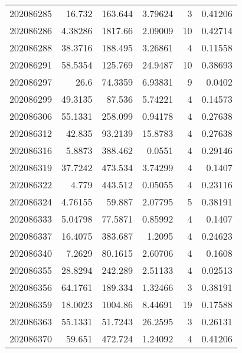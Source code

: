 \begin{tabular}{rrrrrr}
 202086285 &         16.732   &      163.644  &            3.79624 &           3 & 0.41206 \\
 202086286 &          4.38286 &     1817.66   &            2.09009 &          10 & 0.42714 \\
 202086288 &         38.3716  &      188.495  &            3.26861 &           4 & 0.11558 \\
 202086291 &         58.5354  &      125.769  &           24.9487  &          10 & 0.38693 \\
 202086297 &         26.6     &       74.3359 &            6.93831 &           9 & 0.0402  \\
 202086299 &         49.3135  &       87.536  &            5.74221 &           4 & 0.14573 \\
 202086306 &         55.1331  &      258.099  &            0.94178 &           4 & 0.27638 \\
 202086312 &         42.835   &       93.2139 &           15.8783  &           4 & 0.27638 \\
 202086316 &          5.8873  &      388.462  &            0.0551  &           4 & 0.29146 \\
 202086319 &         37.7242  &      473.534  &            3.74299 &           4 & 0.1407  \\
 202086322 &          4.779   &      443.512  &            0.05055 &           4 & 0.23116 \\
 202086324 &          4.76155 &       59.887  &            2.07795 &           5 & 0.38191 \\
 202086333 &          5.04798 &       77.5871 &            0.85992 &           4 & 0.1407  \\
 202086337 &         16.4075  &      383.687  &            1.2095  &           4 & 0.24623 \\
 202086340 &          7.2629  &       80.1615 &            2.60706 &           4 & 0.1608  \\
 202086355 &         28.8294  &      242.289  &            2.51133 &           4 & 0.02513 \\
 202086356 &         64.1761  &      189.334  &            1.32466 &           3 & 0.38191 \\
 202086359 &         18.0023  &     1004.86   &            8.44691 &          19 & 0.17588 \\
 202086363 &         55.1331  &       51.7243 &           26.2595  &           3 & 0.26131 \\
 202086370 &         59.651   &      472.724  &            1.24092 &           4 & 0.41206 \\

\end{tabular}
